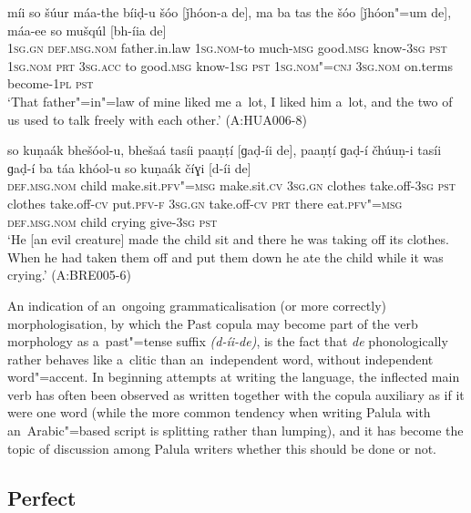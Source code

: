 \begin{exe}
\ex
\label{ex:9-20}
\gll míi so šúur máa-the bíiḍ-u šóo [ǰhóon-a de], ma ba tas the šóo [ǰhóon"=um de], máa-ee so mušqúl [bh-íia de] \\
\textsc{1sg.gn} \textsc{def.msg.nom} father.in.law \textsc{1sg.nom-}to much-\textsc{msg} good.\textsc{msg} know-\textsc{3sg} \textsc{pst} \textsc{1sg.nom} \textsc{prt} \textsc{3sg.acc}  to good.\textsc{msg} know-\textsc{1sg } \textsc{pst } \textsc{1sg.nom"=cnj}  \textsc{3sg.nom} on.terms become-\textsc{1pl} \textsc{pst} \\
\glt `That father"=in"=law of mine liked me a~lot, I liked him a~lot, and the two of us used to talk freely with each other.' (A:HUA006-8)

\ex
\label{ex:9-21}
\gll so kuṇaák bhešóol-u, bhešaá tasíi paaṇṭí [ɡaḍ-íi de], paaṇṭí ɡaḍ-í čhúuṇ-i tasíi ɡaḍ-í ba táa khóol-u so kuṇaák číɣi [d-íi de] \\
\textsc{def.msg.nom} child make.sit.\textsc{pfv"=msg} make.sit.\textsc{cv} \textsc{3sg.gn}  clothes take.off-\textsc{3sg } \textsc{pst} clothes take.off-\textsc{cv} put.\textsc{pfv-f}  \textsc{3sg.gn} take.off-\textsc{cv} \textsc{prt} there eat.\textsc{pfv"=msg}  \textsc{def.msg.nom} child crying give-\textsc{3sg} \textsc{pst} \\
\glt `He [an evil creature] made the child sit and there he was taking off its clothes. When he had taken them off and put them down he ate the child while it was crying.' (A:BRE005-6)
\end{exe}

An indication of an~ongoing grammaticalisation (or more correctly) morphologisation, by which the Past copula may become part of the verb morphology as a~past"=tense suffix \textit{(d-íi-de)}, is the fact that \textit{de} phonologically rather behaves like a~clitic than an~independent word, without independent word"=accent. In beginning attempts at writing the language, the inflected main verb has often been observed as written together with the copula auxiliary as if it were one word (while the more common tendency when writing Palula with an~Arabic"=based script is splitting rather than lumping), and it has become the topic of discussion among Palula writers whether this should be done or not. 


\subsection{Perfect}
\label{subsec:9-1-7}

